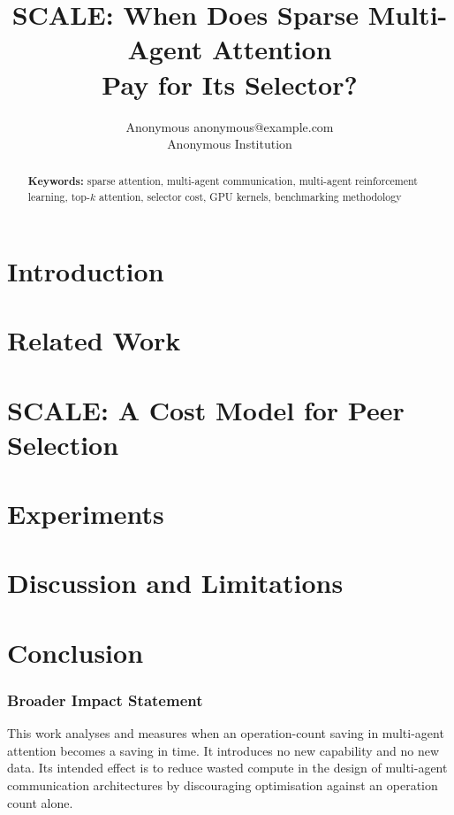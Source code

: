 \documentclass[10pt]{article} %
\title{SCALE: When Does Sparse Multi-Agent Attention\\
Pay for Its Selector?}
\author{\name Anonymous \email anonymous@example.com \\
      \addr Anonymous Institution}
\begin{document}
\maketitle

\begin{abstract}


\medskip\noindent\textbf{Keywords:} sparse attention, multi-agent communication,
multi-agent reinforcement learning, top-$k$ attention, selector cost, GPU
kernels, benchmarking methodology
\end{abstract}

\section{Introduction}
\label{sec:intro}


\section{Related Work}
\label{sec:related}


\section{SCALE: A Cost Model for Peer Selection}
\label{sec:analysis}


\section{Experiments}
\label{sec:measurement}


\section{Discussion and Limitations}
\label{sec:limitations}


\section{Conclusion}
\label{sec:conclusion}


\subsubsection*{Broader Impact Statement}
This work analyses and measures when an operation-count saving in multi-agent
attention becomes a saving in time. It introduces no new capability and no new
data. Its intended effect is to reduce wasted compute in the design of
multi-agent communication architectures by discouraging optimisation against an
operation count alone.
\end{document}
